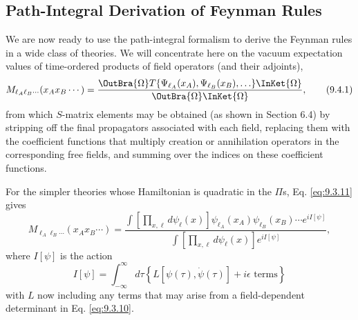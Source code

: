 
\subsection{Path-Integral Derivation of Feynman Rules}

We are now ready to use the path-integral formalism to derive the Feynman
rules in a wide class of theories. We will concentrate here on the vacuum
expectation values of time-ordered products of field operators (and their
adjoints),
\begin{equation}
M_{\ell_A\ell_B\cdots}(x_Ax_B\cdots)
=\frac{\OutBra{\Omega}T\{\Psi_{\ell_A}(x_A),
 \Psi_{\ell_B}(x_B),\ldots\}\InKet{\Omega}}
 {\OutBra{\Omega}\InKet{\Omega}},
\tag{9.4.1}\label{eq:9.4.1}
\end{equation}
from which $S$-matrix elements may be obtained (as shown in Section 6.4) by
stripping off the final propagators associated with each field, replacing them
with the coefficient functions that multiply creation or annihilation
operators in the corresponding free fields, and summing over the indices on
these coefficient functions.

For the simpler theories whose Hamiltonian is quadratic in the $\Pi$s,
Eq. \eqref{eq:9.3.11} gives
\begin{equation}
M_{\ell_A\ell_B\cdots}(x_Ax_B\cdots)
=\frac{\displaystyle\int\left[\prod_{x,\ell}d\psi_\ell(x)\right]
 \psi_{\ell_A}(x_A)\psi_{\ell_B}(x_B)\cdots e^{iI[\psi]}}
 {\displaystyle\int\left[\prod_{x,\ell}d\psi_\ell(x)\right]e^{iI[\psi]}},
\tag{9.4.2}\label{eq:9.4.2}
\end{equation}
where $I[\psi]$ is the action
\begin{equation}
I[\psi]=\int_{-\infty}^{\infty}d\tau
 \left\{L[\psi(\tau),\dot\psi(\tau)]+i\epsilon\text{ terms}\right\}
\tag{9.4.3}\label{eq:9.4.3}
\end{equation}
with $L$ now including any terms that may arise from a field-dependent
determinant in Eq. \eqref{eq:9.3.10}.

